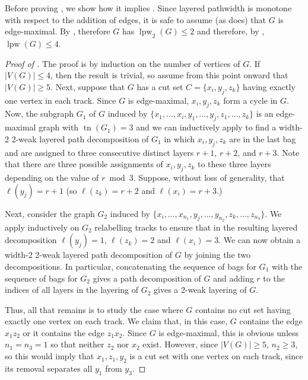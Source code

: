 \documentclass{patmorin}
\DeclareMathOperator{\tr}{tn}
\DeclareMathOperator{\lpw}{lpw}
\begin{document}
Before proving , we show how it implies .
Since layered pathwidth is monotone with respect to the addition of edges,
it is safe to assume (as  does) that $G$ is edge-maximal.
By , therefore $G$ has $\lpw_2(G)\le2$ and therefore, by
, $\lpw(G)\le 4$.

\begin{proof}[Proof of ]
  The proof is by induction on the number of vertices of $G$.  If
  $|V(G)|\le 4$, then the result is trivial, so assume from this point onward that $|V(G)|\ge 5$.  Next, suppose that $G$ has
  a cut set $C=\{x_i,y_j,z_k\}$ having exactly one vertex in each track.
  Since $G$ is edge-maximal, $x_i,y_j,z_k$ form a cycle in $G$.  Now,
  the subgraph $G_1$ of $G$ induced by $\{x_1,\ldots,x_i, y_1,\ldots,y_j,
  z_1,\ldots,z_k\}$ is an edge-maximal graph with $\tr(G_1)=3$ and we
  can inductively apply  to find a width-2 2-weak layered
  path decomposition of $G_1$ in which $x_i,y_j,z_k$ are in the last bag
  and are assigned to three consecutive distinct layers $r+1$, $r+2$, and $r+3$.
  Note that there are three possible assignments of $x_i,y_j,z_k$ to
  these three layers depending on the value of $r\bmod 3$.  Suppose,
  without loss of generality, that $\ell(y_j)=r+1$ (so $\ell(z_k)=r+2$
  and $\ell(x_i)=r+3$.)

  Next, consider the graph $G_2$ induced by
  $\{x_i,\ldots,x_{n_1},y_j,\ldots,y_{n_2},z_k,\ldots,z_{n_3}\}$.
  We apply  inductively on $G_2$ relabelling tracks to
  ensure that in the resulting layered decomposition $\ell(y_j)=1$,
  $\ell(z_k)=2$ and $\ell(x_i)=3$.   We can now obtain a width-2 2-weak
  layered path decomposition of $G$ by joining the two decompositions.
  In particular, concatenating the sequence of bags for $G_1$ with
  the sequence of bags for $G_2$ gives a path decomposition of $G$
  and adding $r$ to the indices of all layers in the layering of $G_2$
  gives a 2-weak layering of $G$.

  Thus, all that remains is to study the case where $G$ contains no cut
  set having exactly one vertex on each track.  We claim that, in this
  case, $G$ contains the edge $x_1z_2$ or it contains the edge $z_1x_2$.
  Since $G$ is edge-maximal, this is obvious unless $n_1=n_3=1$ so
  that neither $z_2$ nor $x_2$ exist.  However, since $|V(G)|\ge 5$, $n_2\ge 3$, so  this would imply that $x_1,z_1,y_2$ is a cut set with one vertex on
  each track, since its removal separates all $y_1$ from $y_3$.


\end{proof}
\end{document}
